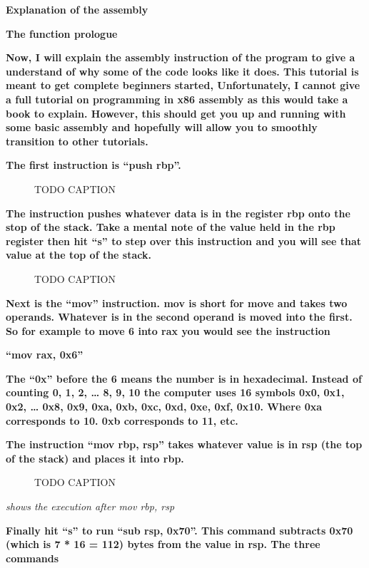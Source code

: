 \documentclass[letterpaper]{article}
\newcommand{\sitfig}[3]{
\begin{figure}[H]
\centering
\makebox[\textwidth][c]{
#2
}
\caption{#3}
\label{#1}
\end{figure}
}
\newcommand{\sitgfx}[4][scale=1.0]{
\sitfig{#3}{\texttt{[image: \#2]}}{#4}
}
\begin{document}
{\centering
\textbf{Explanation of the assembly}
\par}

\textbf{The function prologue}

\textbf{Now, I will explain the assembly instruction of the program to give a understand of why some of the code looks
like it does. This tutorial is meant to get complete beginners started, Unfortunately, I cannot give a full tutorial on
programming in x86 assembly as this would take a book to explain. However, this should get you up and running with some
basic assembly and hopefully will allow you to smoothly transition to other tutorials.}

\textbf{The first instruction is ``push rbp''.}

  
\sitgfx[width=5.8335in,height=0.7035in]{FINALWORKINGDOCFORMERLYPRECURSOR-img086.png}{fig:unk}{TODO CAPTION}
 

\textbf{The instruction pushes whatever data is in the register rbp onto the stop of the stack. Take a mental note of
the value held in the rbp register then hit ``s'' to step over this instruction and you will see that value at the top
of the stack.}

  
\sitgfx[width=5.8335in,height=3.6457in]{FINALWORKINGDOCFORMERLYPRECURSOR-img087.png}{fig:unk}{TODO CAPTION}
 

\textbf{Next is the ``mov'' instruction. mov is short for move and takes two operands. Whatever is in the second operand
is moved into the first. So for example to move 6 into rax you would see the instruction}

\textbf{{}``mov rax, 0x6''}

\textbf{The ``0x'' before the 6 means the number is in hexadecimal. Instead of counting 0, 1, 2, {\dots} 8, 9, 10 the
computer uses 16 symbols 0x0, 0x1, 0x2, {\dots} 0x8, 0x9, 0xa, 0xb, 0xc, 0xd, 0xe, 0xf, 0x10. Where 0xa corresponds to
10. 0xb corresponds to 11, etc.}

\textbf{The instruction ``mov rbp, rsp'' takes whatever value is in rsp (the top of the stack) and places it into rbp.}

  
\sitgfx[width=5.8335in,height=3.6457in]{FINALWORKINGDOCFORMERLYPRECURSOR-img088.png}{fig:unk}{TODO CAPTION}
 

\textit{shows the execution after mov rbp, rsp}

\textbf{Finally hit ``s'' to run ``sub rsp, 0x70''. This command subtracts 0x70 (which is 7 * 16 = 112) bytes from the
value in rsp. The three commands}
\end{document}
